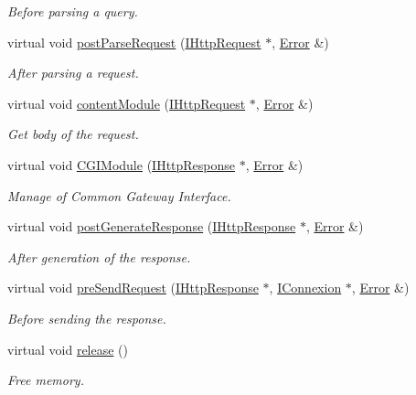 \begin{DoxyCompactItemize}
\begin{DoxyCompactList}\small\item\em Before parsing a query. \end{DoxyCompactList}\item 
virtual void \hyperlink{classapimeal_1_1AModule_a2826a882eda9e5e7b5b6ca6b1051a479}{post\-Parse\-Request} (\hyperlink{classapimeal_1_1IHttpRequest}{I\-Http\-Request} $\ast$, \hyperlink{structapimeal_1_1Error}{Error} \&)
\begin{DoxyCompactList}\small\item\em After parsing a request. \end{DoxyCompactList}\item 
virtual void \hyperlink{classapimeal_1_1AModule_a01660e7d5ed59a20e9a81e03958a9911}{content\-Module} (\hyperlink{classapimeal_1_1IHttpRequest}{I\-Http\-Request} $\ast$, \hyperlink{structapimeal_1_1Error}{Error} \&)
\begin{DoxyCompactList}\small\item\em Get body of the request. \end{DoxyCompactList}\item 
virtual void \hyperlink{classapimeal_1_1AModule_aab6161ce426b4ee31b8e17bdcdfcbfea}{C\-G\-I\-Module} (\hyperlink{classapimeal_1_1IHttpResponse}{I\-Http\-Response} $\ast$, \hyperlink{structapimeal_1_1Error}{Error} \&)
\begin{DoxyCompactList}\small\item\em Manage of Common Gateway Interface. \end{DoxyCompactList}\item 
virtual void \hyperlink{classapimeal_1_1AModule_ab245f944a40f67dddb5777864677468d}{post\-Generate\-Response} (\hyperlink{classapimeal_1_1IHttpResponse}{I\-Http\-Response} $\ast$, \hyperlink{structapimeal_1_1Error}{Error} \&)
\begin{DoxyCompactList}\small\item\em After generation of the response. \end{DoxyCompactList}\item 
virtual void \hyperlink{classapimeal_1_1AModule_a22ad5b93999ee07024a42aadcd9604e0}{pre\-Send\-Request} (\hyperlink{classapimeal_1_1IHttpResponse}{I\-Http\-Response} $\ast$, \hyperlink{classapimeal_1_1IConnexion}{I\-Connexion} $\ast$, \hyperlink{structapimeal_1_1Error}{Error} \&)
\begin{DoxyCompactList}\small\item\em Before sending the response. \end{DoxyCompactList}\item 
\hypertarget{classapimeal_1_1AModule_adc7136919b05fbde2f0f3b4d3d1bc844}{virtual void \hyperlink{classapimeal_1_1AModule_adc7136919b05fbde2f0f3b4d3d1bc844}{release} ()}\label{classapimeal_1_1AModule_adc7136919b05fbde2f0f3b4d3d1bc844}

\begin{DoxyCompactList}\small\item\em Free memory. \end{DoxyCompactList}\end{DoxyCompactItemize}
